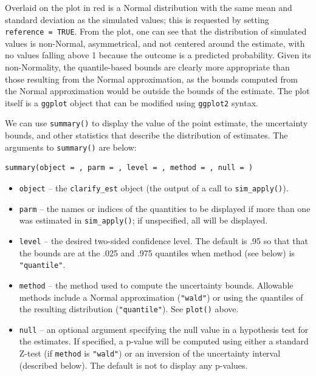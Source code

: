 Overlaid on the plot in red is a Normal distribution with the same mean and standard deviation as the simulated values; this is requested by setting \texttt{reference\ =\ TRUE}. From the plot, one can see that the distribution of simulated values is non-Normal, asymmetrical, and not centered around the estimate, with no values falling above 1 because the outcome is a predicted probability. Given its non-Normality, the quantile-based bounds are clearly more appropriate than those resulting from the Normal approximation, as the bounds computed from the Normal approximation would be outside the bounds of the estimate. The plot itself is a \texttt{ggplot} object that can be modified using \texttt{ggplot2} syntax.

We can use \texttt{summary()} to display the value of the point estimate, the uncertainty bounds, and other statistics that describe the distribution of estimates. The arguments to \texttt{summary()} are below:

\begin{verbatim}
summary(object = , parm = , level = , method = , null = )
\end{verbatim}

\begin{itemize}
\item
  \texttt{object} -- the \texttt{clarify\_est} object (the output of a call to \texttt{sim\_apply()}).
\item
  \texttt{parm} -- the names or indices of the quantities to be displayed if more than one was estimated in \texttt{sim\_apply()}; if unspecified, all will be displayed.
\item
  \texttt{level} -- the desired two-sided confidence level. The default is .95 so that that the bounds are at the .025 and .975 quantiles when method (see below) is \texttt{"quantile"}.
\item
  \texttt{method} -- the method used to compute the uncertainty bounds. Allowable methods include a Normal approximation (\texttt{"wald"}) or using the quantiles of the resulting distribution (\texttt{"quantile"}). See \texttt{plot()} above.
\item
  \texttt{null} -- an optional argument specifying the null value in a hypothesis test for the estimates. If specified, a p-value will be computed using either a standard Z-test (if \texttt{method} is \texttt{"wald"}) or an inversion of the uncertainty interval (described below). The default is not to display any p-values.
\end{itemize}

